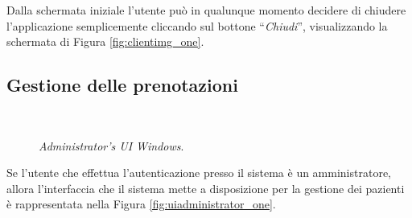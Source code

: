 Dalla schermata iniziale l'utente può in qualunque momento decidere
di chiudere l'applicazione semplicemente cliccando sul bottone {}``\emph{Chiudi}'',
visualizzando la schermata di Figura \vref{fig:clientimg_one}.



\subsection{Gestione delle prenotazioni}

\begin{figure}[!t]
 \centering
   \\
 \caption{\emph{Administrator's UI Windows}.}
 \label{fig:uiadministrator_one}
\end{figure}

Se l'utente che effettua l'autenticazione presso il sistema è un amministratore,
allora l'interfaccia che il sistema mette a disposizione per la gestione
dei pazienti è rappresentata nella Figura \vref{fig:uiadministrator_one}.

